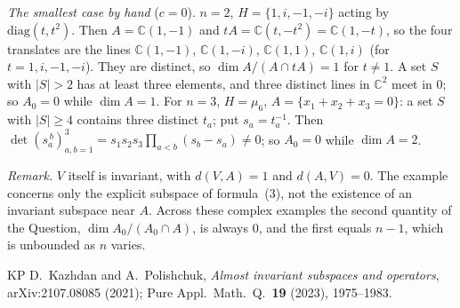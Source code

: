 \documentclass[11pt]{amsart}
\begin{document}
\emph{The smallest case by hand} ($c=0$). $n=2$, $H=\{1,i,-1,-i\}$ acting by $\mathrm{diag}(t,t^2)$. Then
$A=\mathbb C(1,-1)$ and $tA=\mathbb C(t,-t^2)=\mathbb C(1,-t)$, so the four translates are the lines
$\mathbb C(1,-1)$, $\mathbb C(1,-i)$, $\mathbb C(1,1)$, $\mathbb C(1,i)$ (for $t=1,i,-1,-i$). They are distinct, so
$\dim A/(A\cap tA)=1$ for $t\ne1$. A set $S$ with $|S|>2$ has at least three elements, and three distinct lines in
$\mathbb C^2$ meet in $0$; so $A_0=0$ while $\dim A=1$. For $n=3$, $H=\mu_6$, $A=\{x_1+x_2+x_3=0\}$: a set $S$ with
$|S|\ge4$ contains three distinct $t_a$; put $s_a=t_a^{-1}$. Then $\det(s_a^{\,b})_{a,b=1}^3=s_1s_2s_3\prod_{a<b}(s_b-s_a)\ne0$; so
$A_0=0$ while $\dim A=2$.

\emph{Remark.} $V$ itself is invariant, with $d(V,A)=1$ and $d(A,V)=0$. The example concerns only the explicit subspace
of formula~(3), not the existence of an invariant subspace near $A$. Across these complex examples the second quantity of the
Question, $\dim A_0/(A_0\cap A)$, is always $0$, and the first equals $n-1$, which is unbounded as $n$ varies.

\begin{thebibliography}{KP}
 D.~Kazhdan and A.~Polishchuk, \emph{Almost invariant subspaces and operators}, arXiv:2107.08085
(2021); Pure Appl.\ Math.\ Q.\ \textbf{19} (2023), 1975--1983.
\end{thebibliography}
\end{document}
